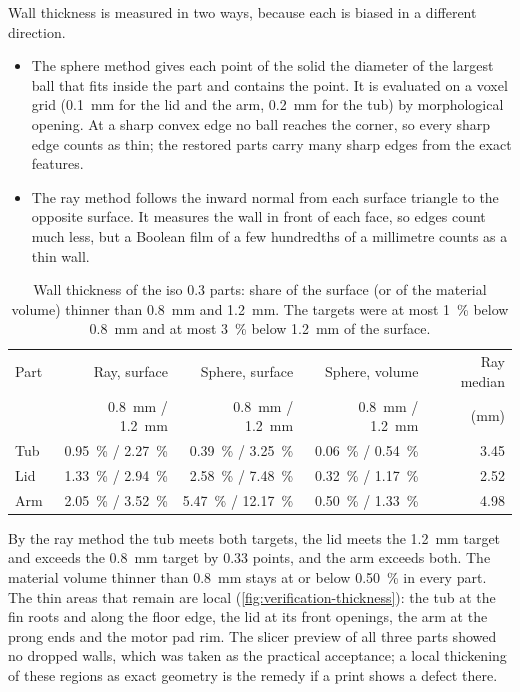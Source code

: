 Wall thickness is measured in two ways, because each is biased in a different direction.
\begin{itemize}
\item The sphere method gives each point of the solid the diameter of the largest ball that fits inside the part and contains the point. It is evaluated on a voxel grid (\SI{0.1}{mm} for the lid and the arm, \SI{0.2}{mm} for the tub) by morphological opening. At a sharp convex edge no ball reaches the corner, so every sharp edge counts as thin; the restored parts carry many sharp edges from the exact features.
\item The ray method follows the inward normal from each surface triangle to the opposite surface. It measures the wall in front of each face, so edges count much less, but a Boolean film of a few hundredths of a millimetre counts as a thin wall.
\end{itemize}

\begin{table}[htbp]
\centering\small
\caption{Wall thickness of the iso 0.3 parts: share of the surface (or of the material volume) thinner than \SI{0.8}{mm} and \SI{1.2}{mm}. The targets were at most \SI{1}{\percent} below \SI{0.8}{mm} and at most \SI{3}{\percent} below \SI{1.2}{mm} of the surface.}\label{tab:verification-thickness}
\begin{tabular}{@{}lrrrr@{}}
\toprule
Part & Ray, surface & Sphere, surface & Sphere, volume & Ray median\\
 & \SI{0.8}{mm} / \SI{1.2}{mm} & \SI{0.8}{mm} / \SI{1.2}{mm} & \SI{0.8}{mm} / \SI{1.2}{mm} & (\si{mm})\\
\midrule
Tub & \SI{0.95}{\percent} / \SI{2.27}{\percent} & \SI{0.39}{\percent} / \SI{3.25}{\percent} & \SI{0.06}{\percent} / \SI{0.54}{\percent} & 3.45\\
Lid & \SI{1.33}{\percent} / \SI{2.94}{\percent} & \SI{2.58}{\percent} / \SI{7.48}{\percent} & \SI{0.32}{\percent} / \SI{1.17}{\percent} & 2.52\\
Arm & \SI{2.05}{\percent} / \SI{3.52}{\percent} & \SI{5.47}{\percent} / \SI{12.17}{\percent} & \SI{0.50}{\percent} / \SI{1.33}{\percent} & 4.98\\
\bottomrule
\end{tabular}
\end{table}

By the ray method the tub meets both targets, the lid meets the \SI{1.2}{mm} target and exceeds the \SI{0.8}{mm} target by 0.33 points, and the arm exceeds both. The material volume thinner than \SI{0.8}{mm} stays at or below \SI{0.50}{\percent} in every part. The thin areas that remain are local (\cref{fig:verification-thickness}): the tub at the fin roots and along the floor edge, the lid at its front openings, the arm at the prong ends and the motor pad rim. The slicer preview of all three parts showed no dropped walls, which was taken as the practical acceptance; a local thickening of these regions as exact geometry is the remedy if a print shows a defect there.


